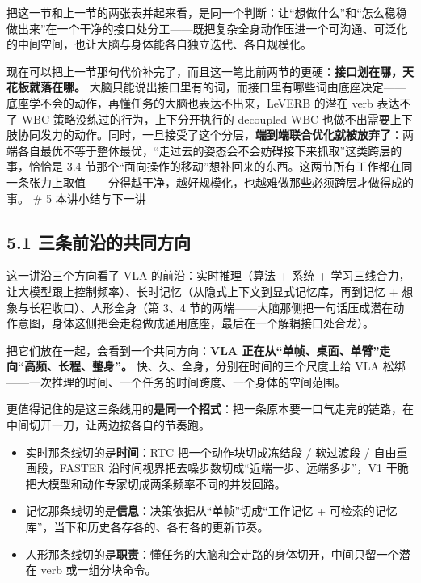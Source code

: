 \documentclass[
  chinese,
]{ctexart}
\providecommand{\tightlist}{%
  \setlength{\itemsep}{0pt}\setlength{\parskip}{0pt}}
\begin{document}
把这一节和上一节的两张表并起来看，是同一个判断：让``想做什么''和``怎么稳稳做出来''在一个干净的接口处分工------既把复杂全身动作压进一个可沟通、可泛化的中间空间，也让大脑与身体能各自独立迭代、各自规模化。

现在可以把上一节那句代价补完了，而且这一笔比前两节的更硬：\textbf{接口划在哪，天花板就落在哪。}
大脑只能说出接口里有的词，而接口里有哪些词由底座决定------底座学不会的动作，再懂任务的大脑也表达不出来，LeVERB
的潜在 verb 表达不了 WBC 策略没练过的行为，上下分开执行的 decoupled WBC
也做不出需要上下肢协同发力的动作。同时，一旦接受了这个分层，\textbf{端到端联合优化就被放弃了}：两端各自最优不等于整体最优，``走过去的姿态会不会妨碍接下来抓取''这类跨层的事，恰恰是
3.4
节那个``面向操作的移动''想补回来的东西。这两节所有工作都在同一条张力上取值------分得越干净，越好规模化，也越难做那些必须跨层才做得成的事。
\# 5 本讲小结与下一讲

\subsection{5.1
三条前沿的共同方向}\label{ux4e09ux6761ux524dux6cbfux7684ux5171ux540cux65b9ux5411}

这一讲沿三个方向看了 VLA 的前沿：实时推理（算法 + 系统 +
学习三线合力，让大模型跟上控制频率）、长时记忆（从隐式上下文到显式记忆库，再到记忆
+ 想象与长程收口）、人形全身（第 3、4
节的两端------大脑那侧把一句话压成潜在动作意图，身体这侧把会走稳做成通用底座，最后在一个解耦接口处合龙）。

把它们放在一起，会看到一个共同方向：\textbf{VLA
正在从``单帧、桌面、单臂''走向``高频、长程、整身''。}
快、久、全身，分别在时间的三个尺度上给 VLA
松绑------一次推理的时间、一个任务的时间跨度、一个身体的空间范围。

更值得记住的是这三条线用的\textbf{是同一个招式}：把一条原本要一口气走完的链路，在中间切开一刀，让两边按各自的节奏跑。

\begin{itemize}
\tightlist
\item
  实时那条线切的是\textbf{时间}：RTC 把一个动作块切成冻结段 / 软过渡段 /
  自由重画段，FASTER 沿时间视界把去噪步数切成``近端一步、远端多步''，V1
  干脆把大模型和动作专家切成两条频率不同的并发回路。
\item
  记忆那条线切的是\textbf{信息}：决策依据从``单帧''切成``工作记忆 +
  可检索的记忆库''，当下和历史各存各的、各有各的更新节奏。
\item
  人形那条线切的是\textbf{职责}：懂任务的大脑和会走路的身体切开，中间只留一个潜在
  verb 或一组分块命令。
\end{itemize}
\end{document}
